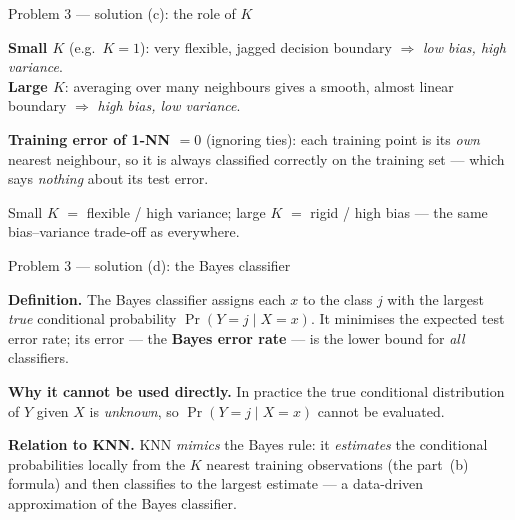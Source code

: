 \documentclass[aspectratio=169,11pt]{beamer}
\begin{document}
\begin{frame}{Problem 3 --- solution (c): the role of $K$}
  \begin{solutionbox}
    \textbf{Small $K$} (e.g.\ $K=1$): very flexible, jagged decision boundary
    $\Rightarrow$ \emph{low bias, high variance}.\\[0.5mm]
    \textbf{Large $K$}: averaging over many neighbours gives a smooth, almost linear boundary
    $\Rightarrow$ \emph{high bias, low variance}.
    \medskip

    \textbf{Training error of 1-NN $=0$} (ignoring ties): each training point is its \emph{own}
    nearest neighbour, so it is always classified correctly on the training set --- which says
    \emph{nothing} about its test error.
  \end{solutionbox}
  \begin{takeaway}
    Small $K$ $=$ flexible / high variance; large $K$ $=$ rigid / high bias --- the same
    bias--variance trade-off as everywhere.
  \end{takeaway}
\end{frame}

\begin{frame}{Problem 3 --- solution (d): the Bayes classifier}
  \begin{solutionbox}
    \textbf{Definition.} The Bayes classifier assigns each $x$ to the class $j$ with the largest
    \emph{true} conditional probability $\Pr(Y=j\mid X=x)$. It minimises the expected test error
    rate; its error --- the \textbf{Bayes error rate} --- is the lower bound for \emph{all}
    classifiers.
    \medskip

    \textbf{Why it cannot be used directly.} In practice the true conditional distribution of $Y$
    given $X$ is \emph{unknown}, so $\Pr(Y=j\mid X=x)$ cannot be evaluated.
    \medskip

    \textbf{Relation to KNN.} KNN \emph{mimics} the Bayes rule: it \emph{estimates} the
    conditional probabilities locally from the $K$ nearest training observations (the part~(b)
    formula) and then classifies to the largest estimate --- a data-driven approximation of the
    Bayes classifier.
  \end{solutionbox}
\end{frame}
\end{document}
